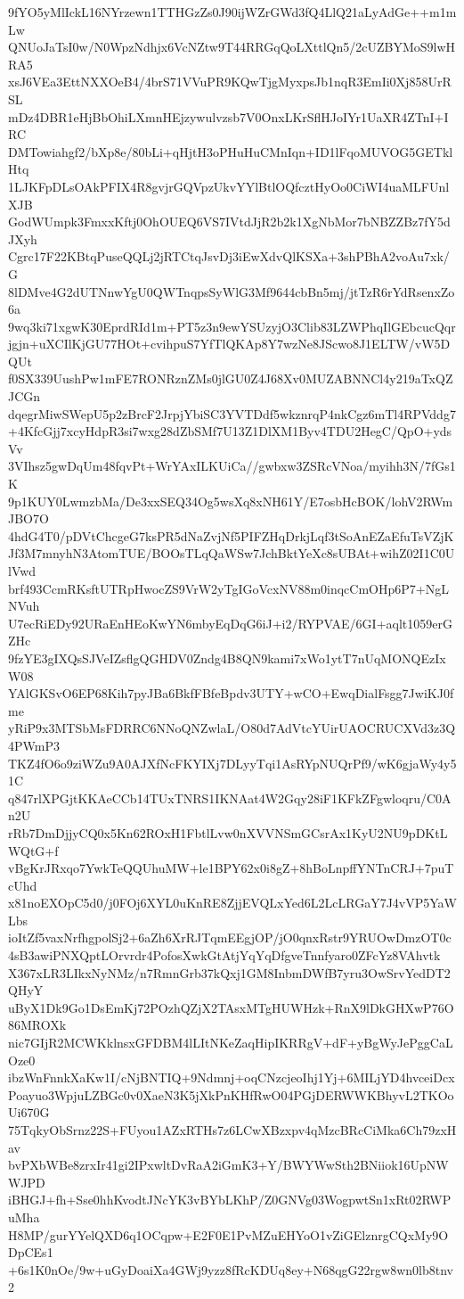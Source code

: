 9fYO5yMlIckL16NYrzewn1TTHGzZs0J90ijWZrGWd3fQ4LlQ21aLyAdGe++m1mLw
QNUoJaTsI0w/N0WpzNdhjx6VcNZtw9T44RRGqQoLXttlQn5/2cUZBYMoS9lwHRA5
xsJ6VEa3EttNXXOeB4/4brS71VVuPR9KQwTjgMyxpsJb1nqR3EmIi0Xj858UrRSL
mDz4DBR1eHjBbOhiLXmnHEjzywulvzsb7V0OnxLKrSflHJoIYr1UaXR4ZTnI+IRC
DMTowiahgf2/bXp8e/80bLi+qHjtH3oPHuHuCMnIqn+ID1lFqoMUVOG5GETklHtq
1LJKFpDLsOAkPFIX4R8gvjrGQVpzUkvYYlBtlOQfcztHyOo0CiWI4uaMLFUnlXJB
GodWUmpk3FmxxKftj0OhOUEQ6VS7IVtdJjR2b2k1XgNbMor7bNBZZBz7fY5dJXyh
Cgrc17F22KBtqPuseQQLj2jRTCtqJsvDj3iEwXdvQlKSXa+3shPBhA2voAu7xk/G
8lDMve4G2dUTNnwYgU0QWTnqpsSyWlG3Mf9644cbBn5mj/jtTzR6rYdRsenxZo6a
9wq3ki71xgwK30EprdRId1m+PT5z3n9ewYSUzyjO3Clib83LZWPhqIlGEbcucQqr
jgjn+uXCIlKjGU77HOt+cvihpuS7YfTlQKAp8Y7wzNe8JScwo8J1ELTW/vW5DQUt
f0SX339UushPw1mFE7RONRznZMs0jlGU0Z4J68Xv0MUZABNNCl4y219aTxQZJCGn
dqegrMiwSWepU5p2zBrcF2JrpjYbiSC3YVTDdf5wkznrqP4nkCgz6mTl4RPVddg7
+4KfcGjj7xcyHdpR3si7wxg28dZbSMf7U13Z1DlXM1Byv4TDU2HegC/QpO+ydsVv
3VIhsz5gwDqUm48fqvPt+WrYAxILKUiCa//gwbxw3ZSRcVNoa/myihh3N/7fGs1K
9p1KUY0LwmzbMa/De3xxSEQ34Og5wsXq8xNH61Y/E7osbHcBOK/lohV2RWmJBO7O
4hdG4T0/pDVtChcgeG7ksPR5dNaZvjNf5PIFZHqDrkjLqf3tSoAnEZaEfuTsVZjK
Jf3M7mnyhN3AtomTUE/BOOsTLqQaWSw7JchBktYeXc8sUBAt+wihZ02I1C0UlVwd
brf493CcmRKsftUTRpHwocZS9VrW2yTgIGoVcxNV88m0inqcCmOHp6P7+NgLNVuh
U7ecRiEDy92URaEnHEoKwYN6mbyEqDqG6iJ+i2/RYPVAE/6GI+aqlt1059erGZHc
9fzYE3gIXQsSJVeIZsflgQGHDV0Zndg4B8QN9kami7xWo1ytT7nUqMONQEzIxW08
YAlGKSvO6EP68Kih7pyJBa6BkfFBfeBpdv3UTY+wCO+EwqDialFsgg7JwiKJ0fme
yRiP9x3MTSbMsFDRRC6NNoQNZwlaL/O80d7AdVtcYUirUAOCRUCXVd3z3Q4PWmP3
TKZ4fO6o9ziWZu9A0AJXfNcFKYIXj7DLyyTqi1AsRYpNUQrPf9/wK6gjaWy4y51C
q847rlXPGjtKKAeCCb14TUxTNRS1IKNAat4W2Gqy28iF1KFkZFgwloqru/C0An2U
rRb7DmDjjyCQ0x5Kn62ROxH1FbtlLvw0nXVVNSmGCsrAx1KyU2NU9pDKtLWQtG+f
vBgKrJRxqo7YwkTeQQUhuMW+le1BPY62x0i8gZ+8hBoLnpffYNTnCRJ+7puTcUhd
x81noEXOpC5d0/j0FOj6XYL0uKnRE8ZjjEVQLxYed6L2LcLRGaY7J4vVP5YaWLbs
ioItZf5vaxNrfhgpolSj2+6aZh6XrRJTqmEEgjOP/jO0qnxRstr9YRUOwDmzOT0c
4sB3awiPNXQptLOrvrdr4PofosXwkGtAtjYqYqDfgveTnnfyaro0ZFcYz8VAhvtk
X367xLR3LIkxNyNMz/n7RmnGrb37kQxj1GM8InbmDWfB7yru3OwSrvYedDT2QHyY
uByX1Dk9Go1DsEmKj72POzhQZjX2TAsxMTgHUWHzk+RnX9lDkGHXwP76O86MROXk
nic7GIjR2MCWKklnsxGFDBM4lLItNKeZaqHipIKRRgV+dF+yBgWyJePggCaLOze0
ibzWnFnnkXaKw1I/cNjBNTIQ+9Ndmnj+oqCNzcjeoIhj1Yj+6MILjYD4hvceiDcx
Poayuo3WpjuLZBGc0v0XaeN3K5jXkPnKHfRwO04PGjDERWWKBhyvL2TKOoUi670G
75TqkyObSrnz22S+FUyou1AZxRTHs7z6LCwXBzxpv4qMzcBRcCiMka6Ch79zxHav
bvPXbWBe8zrxIr41gi2IPxwltDvRaA2iGmK3+Y/BWYWwSth2BNiiok16UpNWWJPD
iBHGJ+fh+Sse0hhKvodtJNcYK3vBYbLKhP/Z0GNVg03WogpwtSn1xRt02RWPuMha
H8MP/gurYYelQXD6q1OCqpw+E2F0E1PvMZuEHYoO1vZiGElznrgCQxMy9ODpCEs1
+6s1K0nOe/9w+uGyDoaiXa4GWj9yzz8fRcKDUq8ey+N68qgG22rgw8wn0lb8tnv2
